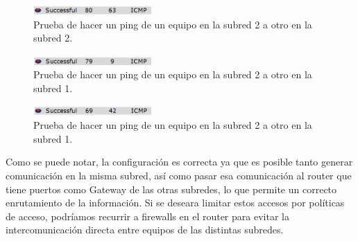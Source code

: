 \documentclass[../main.tex]{subfiles}
\begin{document}
\begin{figure}[H]
  \centering
  \includegraphics[width=0.4\textwidth]{images/test7.PNG}
  \caption{Prueba de hacer un ping de un equipo en la subred 2 a otro en la subred 2.}\label{fig:t7}
\end{figure}

\begin{figure}[H]
  \centering
  \includegraphics[width=0.4\textwidth]{images/test8.PNG}
  \caption{Prueba de hacer un ping de un equipo en la subred 2 a otro en la subred 1.}\label{fig:t8}
\end{figure}

\begin{figure}[H]
  \centering
  \includegraphics[width=0.4\textwidth]{images/test9.PNG}
  \caption{Prueba de hacer un ping de un equipo en la subred 2 a otro en la subred 1.}\label{fig:t9}
\end{figure}

Como se puede notar, la configuración es correcta ya que es posible tanto generar comunicación en la misma subred, así como pasar esa comunicación al router que tiene puertos como Gateway de las otras subredes, lo que permite un correcto enrutamiento de la información. Si se deseara limitar estos accesos por políticas de acceso, podríamos recurrir a firewalls en el router para evitar la intercomunicación directa entre equipos de las distintas subredes.
\end{document}
